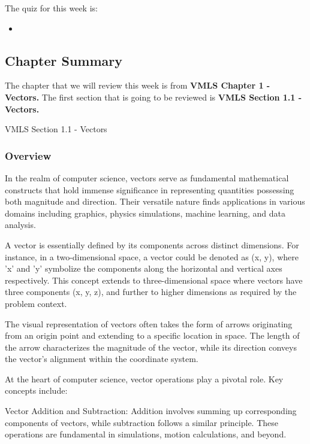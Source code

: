 The quiz for this week is:

\begin{itemize}
    \item {}
\end{itemize}

\subsection{Chapter Summary}

The chapter that we will review this week is from \textbf{VMLS Chapter 1 - Vectors.} The first section that is going to be reviewed is \textbf{VMLS Section 1.1 - Vectors.}

\begin{notes}{VMLS Section 1.1 - Vectors}
    \subsubsection*{Overview}

    In the realm of computer science, vectors serve as fundamental mathematical constructs that hold immense significance in representing quantities possessing both magnitude and direction. Their 
    versatile nature finds applications in various domains including graphics, physics simulations, machine learning, and data analysis.

    A vector is essentially defined by its components across distinct dimensions. For instance, in a two-dimensional space, a vector could be denoted as (x, y), where 'x' and 'y' symbolize the 
    components along the horizontal and vertical axes respectively. This concept extends to three-dimensional space where vectors have three components (x, y, z), and further to higher dimensions 
    as required by the problem context.

    The visual representation of vectors often takes the form of arrows originating from an origin point and extending to a specific location in space. The length of the arrow characterizes the 
    magnitude of the vector, while its direction conveys the vector's alignment within the coordinate system.

    At the heart of computer science, vector operations play a pivotal role. Key concepts include:

    Vector Addition and Subtraction: Addition involves summing up corresponding components of vectors, while subtraction follows a similar principle. These operations are fundamental in simulations, 
    motion calculations, and beyond.


\end{notes}
